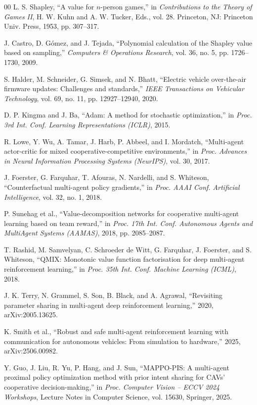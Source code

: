 \documentclass[conference]{IEEEtran}
\begin{document}
\begin{thebibliography}{00}
L. S. Shapley, ``A value for $n$-person games,'' in \textit{Contributions to
the Theory of Games II}, H. W. Kuhn and A. W. Tucker, Eds., vol. 28.
Princeton, NJ: Princeton Univ. Press, 1953, pp. 307--317.

J. Castro, D. G{\'o}mez, and J. Tejada,
``Polynomial calculation of the Shapley value based on sampling,''
\textit{Computers \& Operations Research}, vol. 36, no. 5, pp. 1726--1730, 2009.

S. Halder, M. Schneider, G. Simsek, and N. Bhatt,
``Electric vehicle over-the-air firmware updates: Challenges and standards,''
\textit{IEEE Transactions on Vehicular Technology}, vol. 69, no. 11,
pp. 12927--12940, 2020.

D. P. Kingma and J. Ba, ``Adam: A method for stochastic optimization,''
in \textit{Proc. 3rd Int. Conf. Learning Representations (ICLR)}, 2015.

R. Lowe, Y. Wu, A. Tamar, J. Harb, P. Abbeel, and I. Mordatch,
``Multi-agent actor-critic for mixed cooperative-competitive environments,'' in
\textit{Proc. Advances in Neural Information Processing Systems (NeurIPS)},
vol. 30, 2017.

J. Foerster, G. Farquhar, T. Afouras, N. Nardelli, and S. Whiteson,
``Counterfactual multi-agent policy gradients,'' in \textit{Proc. AAAI Conf.
Artificial Intelligence}, vol. 32, no. 1, 2018.

P. Sunehag et al., ``Value-decomposition networks for cooperative
multi-agent learning based on team reward,'' in \textit{Proc. 17th Int. Conf.
Autonomous Agents and MultiAgent Systems (AAMAS)}, 2018, pp. 2085--2087.

T. Rashid, M. Samvelyan, C. Schroeder de Witt, G. Farquhar, J. Foerster,
and S. Whiteson, ``QMIX: Monotonic value function factorisation for deep
multi-agent reinforcement learning,'' in \textit{Proc. 35th Int. Conf.
Machine Learning (ICML)}, 2018.

J. K. Terry, N. Grammel, S. Son, B. Black, and A. Agrawal, ``Revisiting
parameter sharing in multi-agent deep reinforcement learning,'' 2020,
arXiv:2005.13625.

K. Smith et al., ``Robust and safe multi-agent reinforcement learning
with communication for autonomous vehicles: From simulation to hardware,'' 2025,
arXiv:2506.00982.

Y. Guo, J. Liu, R. Yu, P. Hang, and J. Sun, ``MAPPO-PIS: A multi-agent
proximal policy optimization method with prior intent sharing for CAVs'
cooperative decision-making,'' in \textit{Proc. Computer Vision -- ECCV 2024
Workshops}, Lecture Notes in Computer Science, vol. 15630, Springer, 2025.


\end{thebibliography}
\end{document}
